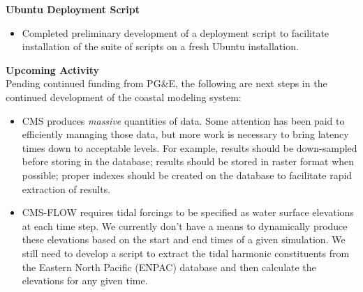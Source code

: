 \documentclass[11pt,letterpaper,oneside,reqno]{article}
\begin{document}
\textbf{Ubuntu Deployment Script}
\begin{itemize}
\item Completed preliminary development of a deployment script to facilitate installation of the suite of scripts on a fresh Ubuntu installation.
\end{itemize}

\textbf{Upcoming Activity}\\
Pending continued funding from PG\&E, the following are next steps in the continued development of the coastal modeling system:
\begin{itemize}
\item CMS produces \textit{massive} quantities of data.  Some attention has been paid to efficiently managing those data, but more work is necessary to bring latency times down to acceptable levels.  For example, results should be down-sampled before storing in the database; results should be stored in raster format when possible; proper indexes should be created on the database to facilitate rapid extraction of results.
\item CMS-FLOW requires tidal forcings to be specified as water surface elevations at each time step.  We currently don't have a means to dynamically produce these elevations based on the start and end times of a given simulation.  We still need to develop a script to extract the tidal harmonic constituents from the Eastern North Pacific (ENPAC) database and then calculate the elevations for any given time.
\end{itemize}
\end{document}
